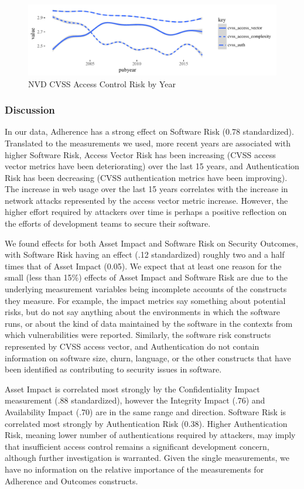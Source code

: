 \begin{figure}
	\centering
	\includegraphics[width=\columnwidth]{nvd_cvss_auth}
	\caption{NVD CVSS Access Control Risk by Year}
	\label{fig:nvd_vulns_auth}
\end{figure}
\subsubsection{Discussion}
\label{sec:case_nvd_discussion}
In our data, Adherence has a strong effect on Software Risk (0.78 standardized). Translated to the measurements we used, more recent years are associated with higher Software Risk, Access Vector Risk has been increasing (CVSS access vector metrics have been deteriorating) over the last 15 years, and Authentication Risk has been decreasing (CVSS authentication metrics have been improving). The increase in web usage over the last 15 years correlates with the increase in network attacks represented by the access vector metric increase. However, the higher effort required by attackers over time is perhaps a positive reflection on the efforts of development teams to secure their software.  
 
We found effects for both Asset Impact and Software Risk on Security Outcomes, with Software Risk having an effect (.12 standardized) roughly two and a half times that of Asset Impact (0.05). We expect that at least one reason for the small (less than 15\%) effects of Asset Impact and Software Risk are due to the underlying measurement variables being incomplete accounts of the constructs they measure. For example, the impact metrics say something about potential risks, but do not say anything about the environments in which the software runs, or about the kind of data maintained by the software in the contexts from which vulnerabilities were reported. Similarly, the software risk constructs represented by CVSS access vector, and Authentication do not contain information on software size, churn, language, or the other constructs that have been identified as contributing to security issues in software. 

Asset Impact is correlated most strongly by the Confidentiality Impact measurement (.88 standardized), however the Integrity Impact (.76) and Availability Impact (.70) are in the same range and direction. Software Risk is correlated most strongly by Authentication Risk (0.38). Higher Authentication Risk, meaning lower number of authentications required by attackers, may imply that insufficient access control remains a significant development concern, although further investigation is warranted. Given the single measurements, we have no information on the relative importance of the measurements for Adherence and Outcomes constructs.

